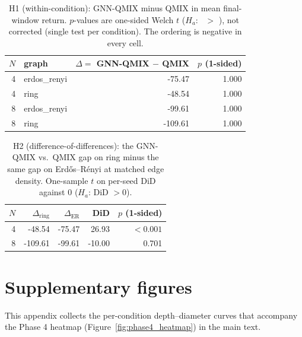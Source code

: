 \begin{appendices}
\begin{table}[!ht]
  \centering
  \footnotesize
  \caption{H1 (within-condition): GNN-QMIX minus QMIX in mean final-window
  return. $p$-values are one-sided Welch $t$ ($H_a$: \gnnqmix\ $>$ \qmix),
  not corrected (single test per condition). The ordering is negative in
  every cell.}
  \label{tab:phase2_h1}
  \begin{tabular}{rlrr}
    \toprule
    $N$ & graph & $\Delta = $ GNN-QMIX $-$ QMIX & $p$ (1-sided) \\
    \midrule
    4 & erdos\_renyi & -75.47 & 1.000 \\
4 & ring & -48.54 & 1.000 \\
8 & erdos\_renyi & -99.61 & 1.000 \\
8 & ring & -109.61 & 1.000 \\
    \bottomrule
  \end{tabular}
\end{table}

\begin{table}[!ht]
  \centering
  \footnotesize
  \caption{H2 (difference-of-differences): the GNN-QMIX vs.\ QMIX gap on
  ring minus the same gap on Erd\H{o}s--R\'enyi at matched edge density.
  One-sample $t$ on per-seed DiD against 0 ($H_a$: DiD $> 0$).}
  \label{tab:phase2_h2}
  \begin{tabular}{rrrrr}
    \toprule
    $N$ & $\Delta_{\text{ring}}$ & $\Delta_{\text{ER}}$ & DiD & $p$ (1-sided) \\
    \midrule
    4 & -48.54 & -75.47 & 26.93 & $<0.001$ \\
8 & -109.61 & -99.61 & -10.00 & 0.701 \\
    \bottomrule
  \end{tabular}
\end{table}

\section{Supplementary figures}
\label{app:figures}

This appendix collects the per-condition depth--diameter curves that
accompany the Phase 4 heatmap (Figure~\ref{fig:phase4_heatmap}) in the main
text.


\end{appendices}
